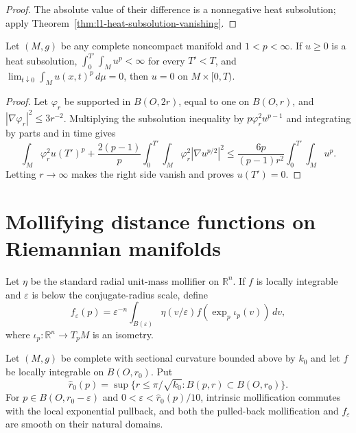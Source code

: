 \begin{proof}
\sketch
The absolute value of their difference is a nonnegative heat subsolution;
apply Theorem~\ref{thm:l1-heat-subsolution-vanishing}.
\end{proof}

\begin{theorem}
\label{thm:lp-heat-subsolution-vanishing}

Let $(M,g)$ be any complete noncompact manifold and $1<p<\infty$.  If
$u\geq0$ is a heat subsolution,
$\int_0^{T'}\int_Mu^p<\infty$ for every $T'<T$, and
$\lim_{t\downarrow0}\int_Mu(x,t)^p\,d\mu=0$, then
$u=0$ on $M\times[0,T)$.
\end{theorem}

\begin{proof}
\sketch
{}
Let $\varphi_r$ be supported in $B(O,2r)$, equal to one on $B(O,r)$, and
$|\nabla\varphi_r|^2\leq3r^{-2}$.  Multiplying the subsolution inequality by
$p\varphi_r^2u^{p-1}$ and integrating by parts and in time gives
\[
\int_M\varphi_r^2u(T')^p+
\frac{2(p-1)}p\int_0^{T'}\!\int_M
\varphi_r^2|\nabla u^{p/2}|^2
\leq\frac{6p}{(p-1)r^2}\int_0^{T'}\!\int_Mu^p.
\]
Letting $r\to\infty$ makes the right side vanish and proves $u(T')=0$.
\end{proof}

\section{Mollifying distance functions on Riemannian manifolds}

Let $\eta$ be the standard radial unit-mass mollifier on $\mathbb R^n$.  If
$f$ is locally integrable and $\varepsilon$ is below the conjugate-radius
scale, define
\[
f_\varepsilon(p)=\varepsilon^{-n}\int_{B(\varepsilon)}
\eta(v/\varepsilon)f(\exp_p\iota_p(v))\,dv,
\]
where $\iota_p:\mathbb R^n\to T_pM$ is an isometry.

\begin{lemma}
\label{lem:intrinsic-mollification-smooth}

Let $(M,g)$ be complete with sectional curvature bounded above by $k_0$ and
let $f$ be locally integrable on $B(O,r_0)$.  Put
\[
\widehat r_0(p)=\sup\{r\leq\pi/\sqrt{k_0}:B(p,r)\subset B(O,r_0)\}.
\]
For $p\in B(O,r_0-\varepsilon)$ and
$0<\varepsilon<\widehat r_0(p)/10$, intrinsic mollification commutes with the
local exponential pullback, and both the pulled-back mollification and
$f_\varepsilon$ are smooth on their natural domains.
\end{lemma}

